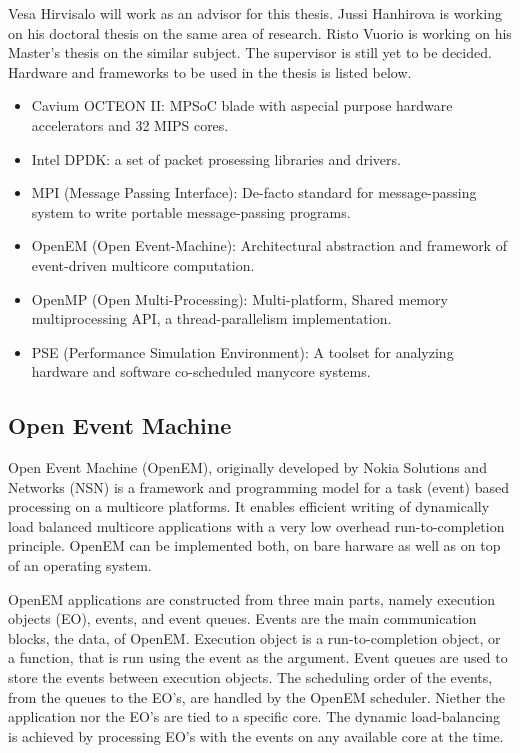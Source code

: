 Vesa Hirvisalo will work as an advisor for this thesis. Jussi Hanhirova is working on his doctoral thesis on the same area of research. Risto Vuorio is working on his Master's thesis on the similar subject. The supervisor is still yet to be decided. Hardware and frameworks to be used in the thesis is listed below.

\begin{itemize}
\item Cavium OCTEON II: MPSoC blade with aspecial purpose hardware accelerators and 32 MIPS cores.

\item Intel DPDK: a set of packet prosessing libraries and drivers.

\item MPI (Message Passing Interface): De-facto standard for message-passing system to write portable message-passing programs.

\item OpenEM (Open Event-Machine): Architectural abstraction and framework of event-driven multicore computation.

\item OpenMP (Open Multi-Processing): Multi-platform, Shared memory multiprocessing API, a thread-parallelism implementation.

\item PSE (Performance Simulation Environment): A toolset for analyzing hardware and software co-scheduled manycore systems.
\end{itemize}

\subsection{Open Event Machine}
Open Event Machine (OpenEM), originally developed by Nokia Solutions and Networks (NSN) is a framework and programming model for a task (event) based processing on a multicore platforms. It enables efficient writing of dynamically load balanced multicore applications with a very low overhead run-to-completion principle. OpenEM can be implemented both, on bare harware as well as on top of an operating system.

OpenEM applications are constructed from three main parts, namely execution objects (EO), events, and event queues. Events are the main communication blocks, the data, of OpenEM. Execution object is a run-to-completion object, or a function, that is run using the event as the argument. Event queues are used to store the events between execution objects. The scheduling order of the events, from the queues to the EO's, are handled by the OpenEM scheduler. Niether the application nor the EO's are tied to a specific core. The dynamic load-balancing is achieved by processing EO's with the events on any available core at the time.

